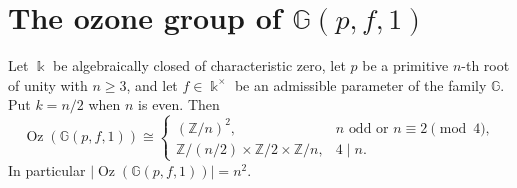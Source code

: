 \section{The ozone group of $\mathbb G(p,f,1)$}
\label{sec:Gozcomplete}
\begin{theorem}\label{thm:Gozcomplete}
Let $\Bbbk$ be algebraically closed of characteristic zero, let $p$ be a
primitive $n$-th root of unity with $n\ge3$, and let $f\in\Bbbk^\times$
be an admissible parameter of the family $\mathbb G$. Put
$k=n/2$ when $n$ is even. Then
\[
 \operatorname{Oz}(\mathbb G(p,f,1))\cong
 \begin{cases}
 (\mathbb Z/n)^2,&n\text{ odd or }n\equiv2\pmod4,\\
 \mathbb Z/(n/2)\times\mathbb Z/2\times\mathbb Z/n,&4\mid n.
 \end{cases}
\]
In particular $|\operatorname{Oz}(\mathbb G(p,f,1))|=n^2$.
\end{theorem}
